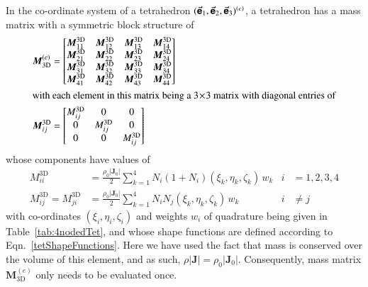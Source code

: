 In the co-ordinate system of a tetrahedron $( \vec{\boldsymbol{\mathsf{e}}}_1 , \vec{\boldsymbol{\mathsf{e}}}_2 , \vec{\boldsymbol{\mathsf{e}}}_3  )^{(e)}$, a tetrahedron has a mass matrix with a symmetric block structure of
\begin{subequations}
    \begin{align}
    \boldsymbol{M}^{(e)}_{\mathrm{3D}} & = 
    \begin{bmatrix}
        \boldsymbol{M}^{\mathrm{3D}}_{11} & \boldsymbol{M}^{\mathrm{3D}}_{12} & 
        \boldsymbol{M}^{\mathrm{3D}}_{13} & \boldsymbol{M}^{\mathrm{3D}}_{14} \\
        \boldsymbol{M}^{\mathrm{3D}}_{21} & \boldsymbol{M}^{\mathrm{3D}}_{22} & 
        \boldsymbol{M}^{\mathrm{3D}}_{23} & \boldsymbol{M}^{\mathrm{3D}}_{24} \\
        \boldsymbol{M}^{\mathrm{3D}}_{31} & \boldsymbol{M}^{\mathrm{3D}}_{32} & 
        \boldsymbol{M}^{\mathrm{3D}}_{33} & \boldsymbol{M}^{\mathrm{3D}}_{34} \\
        \boldsymbol{M}^{\mathrm{3D}}_{41} & \boldsymbol{M}^{\mathrm{3D}}_{42} & 
        \boldsymbol{M}^{\mathrm{3D}}_{43} & \boldsymbol{M}^{\mathrm{3D}}_{44} 
    \end{bmatrix} \\
    \intertext{with each element in this matrix being a $3 \! \times \! 3$ matrix with diagonal entries of}
    \boldsymbol{M}^{\mathrm{3D}}_{ij} & = 
    \begin{bmatrix}
        M^{\mathrm{3D}}_{ij} & 0 & 0 \\
        0 & M^{\mathrm{3D}}_{ij} & 0 \\
        0 & 0 & M^{\mathrm{3D}}_{ij}
    \end{bmatrix}
    \end{align}
\end{subequations}
whose components have values of
\begin{subequations}
    \begin{align}
    M_{ii}^{\mathrm{3D}} & = 
    \frac{\rho_0 | \mathbf{J}_0 |}{2} \sum_{k=1}^4 N_i ( 1 + 
    N_i ) ( \xi_k , \eta_k , \zeta_k ) \, w_k & i & = 1,2,3,4 \\
    M_{ij}^{\mathrm{3D}} = M_{ji}^{\mathrm{3D}} & =
    \frac{\rho_0 | \mathbf{J}_0 |}{2} \sum_{k=1}^4
    N_i N_j (\xi_k , \eta_k , \zeta_k) \, w_k & i & \neq j
    \end{align}
\end{subequations}
with co-ordinates $( \xi_i , \eta_i , \zeta_i )$ and weights $w_i$ of quadrature being given in Table~\ref{tab:4nodedTet}, and whose shape functions are defined according to Eqn.~\eqref{tetShapeFunctions}.  Here we have used the fact that mass is conserved over the volume of this element, and as such, $\rho | \mathbf{J} | = \rho_0 | \mathbf{J}_0 |$.  Consequently, mass matrix $\boldsymbol{M}^{(e)}_{\mathrm{3D}}$ only needs to be evaluated once.

